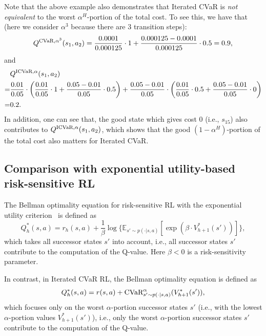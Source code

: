 {	Note that the above example also demonstrates that Iterated CVaR is \emph{not equivalent} to the worst $\alpha^{H}$-portion of the total cost. To see this, we have that (here we consider $\alpha^{3}$ because  there are $3$ transition steps): 
	$$
	Q^{\textup{CVaR}, \alpha^{3}}(s_1,a_2)=\frac{0.0001}{0.000125} \cdot 1+\frac{0.000125-0.0001}{0.000125} \cdot 0.5=0.9 ,
	$$
	and 
	\begin{align*}
		& Q^{\textup{ICVaR}, \alpha}(s_1,a_2)
		\\
		=& \frac{0.01}{0.05} \cdot \left( \frac{0.01}{0.05} \cdot 1 + \frac{0.05-0.01}{0.05} \cdot 0.5 \right) + \frac{0.05-0.01}{0.05} \cdot \left( \frac{0.01}{0.05} \cdot 0.5 + \frac{0.05-0.01}{0.05} \cdot 0 \right) 
		\\
		=& 0.2 .
	\end{align*}
	In addition, one can see that, the good state which gives cost 0 (i.e., $s_{15}$) also contributes to $Q^{\textup{ICVaR}, \alpha}(s_1,a_2)$, which shows that the good $(1-\alpha^H)$-portion of the total cost also matters for Iterated CVaR.
}


\subsection{Comparison with exponential utility-based risk-sensitive RL} \label{apx:comparison_exp_uti}

The Bellman optimality equation for risk-sensitive RL with the exponential utility criterion~\citep{fei2020near_optimal,fei2021exponential} is defined as
$$
Q^*_h(s,a)=r_h(s,a)+\frac{1}{\beta} \log \{ \mathbb{E}_{s' \sim p(\cdot|s,a)} [ \exp (\beta \cdot V^*_{h+1}(s')) ] \} ,
$$
which takes all successor states $s'$ into account, i.e., all successor states $s'$ contribute to the computation of the Q-value. Here $\beta<0$ is a risk-sensitivity parameter.

In contrast, in Iterated CVaR RL, the Bellman optimality equation is defined as
$$
Q^{*}_h(s,a) = r(s,a)+ \textup{CVaR}^{\alpha}_{s' \sim p(\cdot|s,a)}(V^{*}_{h+1}(s')) ,
$$
which focuses only on the worst $\alpha$-portion successor states $s'$ (i.e., with the lowest $\alpha$-portion values $V^{*}_{h+1}(s')$), i.e., only the worst $\alpha$-portion successor states $s'$ contribute to the computation of the Q-value. 

